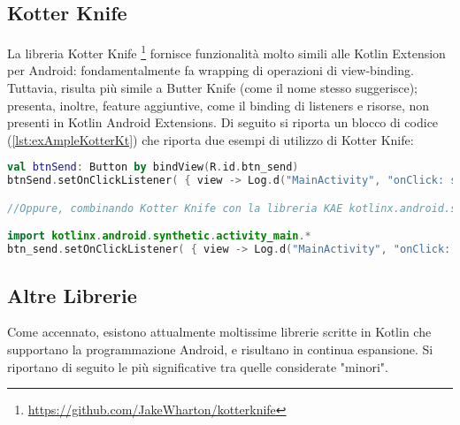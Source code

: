 \subsection{Kotter Knife}
La libreria Kotter Knife \footnote{\url{https://github.com/JakeWharton/kotterknife}} fornisce funzionalità molto simili alle Kotlin Extension per Android: fondamentalmente fa wrapping di operazioni di view-binding. Tuttavia, risulta più simile a Butter Knife (come il nome stesso suggerisce); presenta, inoltre, feature aggiuntive, come il binding di listeners e risorse, non presenti in Kotlin Android Extensions. Di seguito si riporta un blocco di codice (\ref{lst:exAmpleKotterKt}) che riporta due esempi di utilizzo di Kotter Knife:\\

\begin{lstlisting}[caption={Due esempi di uso di Kotter Knife con Kotlin}, captionpos=b, label={lst:exAmpleKotterKt}, language=Kotlin]
val btnSend: Button by bindView(R.id.btn_send)
btnSend.setOnClickListener( { view -> Log.d("MainActivity", "onClick: send") } )

//Oppure, combinando Kotter Knife con la libreria KAE kotlinx.android.synthetic

import kotlinx.android.synthetic.activity_main.*
btn_send.setOnClickListener( { view -> Log.d("MainActivity", "onClick: send") } )
\end{lstlisting}

\subsection{Altre Librerie}
Come accennato, esistono attualmente moltissime librerie scritte in Kotlin che supportano la programmazione Android, e risultano in continua espansione. Si riportano di seguito le più significative tra quelle considerate "minori".\\

